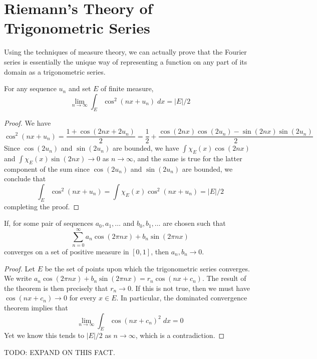 \chapter{Riemann's Theory of Trigonometric Series}

Using the techniques of measure theory, we can actually prove that the Fourier series is essentially the unique way of representing a function on any part of its domain as a trigonometric series.

\begin{lemma}
  For any sequence $u_n$ and set $E$ of finite measure,
  \[ \lim_{n \to \infty} \int_E \cos^2(nx + u_n)\; dx = |E|/2 \]
\end{lemma}
\begin{proof}
  We have
  \[ \cos^2(nx + u_n) = \frac{1 + \cos(2nx + 2u_n)}{2} = \frac{1}{2} + \frac{\cos(2nx) \cos(2u_n) - \sin(2nx) \sin(2u_n)}{2} \]
  Since $\cos(2u_n)$ and $\sin(2u_n)$ are bounded, we have $\int \chi_E(x) \cos(2nx)$ and $\int \chi_E(x) \sin(2nx) \to 0$ as $n \to \infty$, and the same is true for the latter component of the sum since $\cos(2u_n)$ and $\sin(2u_n)$ are bounded, we conclude that
  \[ \int_E \cos^2(nx + u_n) = \int \chi_E(x) \cos^2(nx + u_n) = |E|/2 \]
  completing the proof.
\end{proof}

\begin{theorem}
  If, for some pair of sequences $a_0, a_1, \dots$ and $b_0, b_1, \dots$ are chosen such that
  \[ \sum_{n = 0}^\infty a_n \cos(2 \pi nx) + b_n \sin(2 \pi nx) \]
  converges on a set of positive measure in $[0,1]$, then $a_n, b_n \to 0$.
\end{theorem}
\begin{proof}
  Let $E$ be the set of points upon which the trigonometric series converges. We write $a_n \cos(2 \pi n x) + b_n \sin(2 \pi n x) = r_n \cos(nx + c_n)$. The result of the theorem is then precisely that $r_n \to 0$. If this is not true, then we must have $\cos(nx + c_n) \to 0$ for every $x \in E$. In particular, the dominated convergence theorem implies that
  \[ \lim_{n \to \infty} \int_E \cos(nx + c_n)^2\; dx = 0 \]
  Yet we know this tends to $|E|/2$ as $n \to \infty$, which is a contradiction.
\end{proof}

TODO: EXPAND ON THIS FACT.